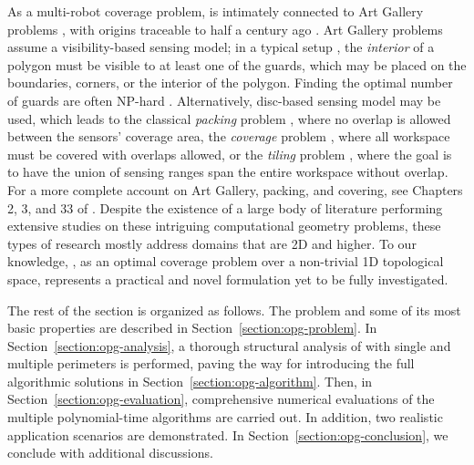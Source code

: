 As a multi-robot coverage problem, \opg is intimately connected to Art 
Gallery problems \cite{o1987art,shermer1992recent}, with origins traceable 
to half a century ago \cite{klee1969every}. Art Gallery problems assume 
a visibility-based \cite{lozano1979algorithm} sensing model; in a typical 
setup \cite{o1987art}, the {\em interior} of a polygon must be visible to at 
least one of the guards, which may be placed on the boundaries, corners, 
or the interior of the polygon. Finding the optimal number of guards are 
often NP-hard \cite{lee1986computational}. Alternatively, disc-based sensing 
model may be used, which leads to the classical {\em packing} problem 
\cite{thue1910dichteste,hales2005proof}, where no overlap is allowed between 
the sensors' coverage area, the {\em coverage} problem 
\cite{drezner1995facility,cortes2004coverage,pavone2009equitable,martinez2010distributed,pierson2017adapting}, 
where all 
workspace must be covered with overlaps allowed, or the {\em tiling} problem 
\cite{kershner1968paving}, where the goal is to have the union of sensing
ranges span the entire workspace without overlap. For a more complete 
account on Art Gallery, packing, and covering, see Chapters 2, 3, and 33 of
\cite{toth2017handbook}. Despite the existence of a large body of literature 
performing extensive studies on these intriguing computational geometry 
problems, these types of research mostly address domains that are 2D and 
higher. To our knowledge, \opg, as an optimal coverage problem over 
a non-trivial 1D topological space, represents a practical and novel formulation 
yet to be fully investigated. 

The rest of the section is organized as follows. 
%
The \opg problem and some of its most basic properties are described 
in Section~\ref{section:opg-problem}. 
%
In Section~\ref{section:opg-analysis}, a thorough structural analysis of \opg 
with single and multiple perimeters is performed, paving the way for 
introducing the full algorithmic solutions in Section~\ref{section:opg-algorithm}.
%
Then, in Section~\ref{section:opg-evaluation}, comprehensive numerical 
evaluations of the multiple polynomial-time algorithms are carried out. 
In addition, two realistic application scenarios are demonstrated. 
%
In Section~\ref{section:opg-conclusion}, we conclude with  
additional discussions. 
